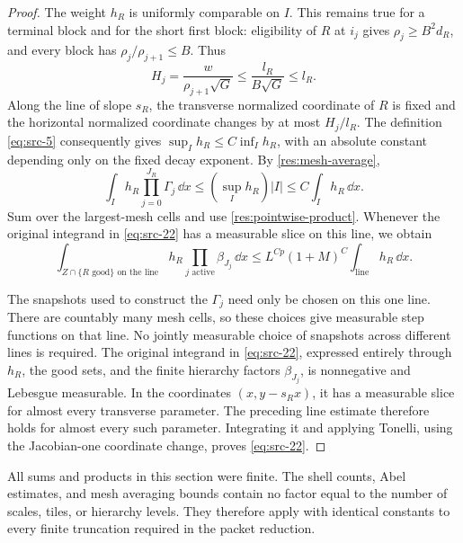 \begin{proof}
The weight $h_R$ is uniformly comparable on $I$.  This remains true
for a terminal block and for the short first block: eligibility
of $R$ at $i_j$ gives $\rho_j\ge B^2d_R$, and every block has
$\rho_j/\rho_{j+1}\le B$.  Thus
\begin{equation}
  H_j=\frac{w}{\rho_{j+1}\sqrt G}
        \le\frac{l_R}{B\sqrt G}\le l_R.
  \label{res:mesh-versus-top}
\end{equation}
Along the line of slope $s_R$, the transverse normalized coordinate
of $R$ is fixed and the horizontal normalized coordinate changes
by at most $H_j/l_R$.  The definition \eqref{eq:src-5} consequently
gives $\sup_I h_R\le C\inf_Ih_R$, with an absolute constant
depending only on the fixed decay exponent.  By
\eqref{res:mesh-average},
\[
 \int_I h_R\prod_{j=0}^{J_R}\Gamma_j\,\dd x
     \le (\sup_Ih_R)|I|\le C\int_Ih_R\,\dd x.
\]
Sum over the largest-mesh cells and use
\eqref{res:pointwise-product}.  Whenever the original integrand in
\eqref{eq:src-22} has a measurable slice on this line, we obtain
\[
 \int_{Z\cap\{R\text{ good}\}\text{ on the line}}
       h_R\prod_{j\text{ active}}\beta_{J_j}\,\dd x
       \le L^{Cp}(1+M)^C
                    \int_{\text{line}}h_R\,\dd x.
\]

The snapshots used to construct the $\Gamma_j$ need only be chosen
on this one line.  There are countably many mesh cells, so these
choices give measurable step functions on that line.  No jointly
measurable choice of snapshots across different lines is required.
The original integrand in \eqref{eq:src-22}, expressed entirely through
$h_R$, the good sets, and the finite hierarchy factors $\beta_{J_j}$, is
nonnegative and Lebesgue measurable.  In the coordinates $(x,y-s_Rx)$,
it has a measurable slice for almost every transverse parameter.  The
preceding line estimate therefore holds for almost every such parameter.
Integrating it and applying Tonelli, using the Jacobian-one coordinate
change, proves
\eqref{eq:src-22}.
\end{proof}

All sums and products in this section were finite.  The shell counts,
Abel estimates, and mesh averaging bounds contain no factor equal to
the number of scales, tiles, or hierarchy levels.  They therefore
apply with identical constants to every finite truncation required
in the packet reduction.
